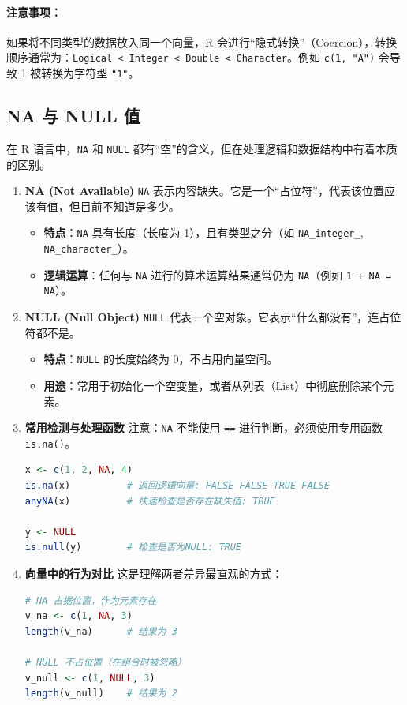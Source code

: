 \paragraph{注意事项：}
如果将不同类型的数据放入同一个向量，R 会进行“隐式转换”（Coercion），转换顺序通常为：\texttt{Logical < Integer < Double < Character}。例如 \texttt{c(1, "A")} 会导致 1 被转换为字符型 \texttt{"1"}。

\subsection{NA 与 NULL 值}

在 R 语言中，\texttt{NA} 和 \texttt{NULL} 都有“空”的含义，但在处理逻辑和数据结构中有着本质的区别。

\begin{enumerate}[label=\arabic*., leftmargin=2em]
    \item \textbf{NA (Not Available)}
    \texttt{NA} 表示内容缺失。它是一个“占位符”，代表该位置应该有值，但目前不知道是多少。
    \begin{itemize}
        \item \textbf{特点}：\texttt{NA} 具有长度（长度为 1），且有类型之分（如 \texttt{NA\_integer\_}, \texttt{NA\_character\_}）。
        \item \textbf{逻辑运算}：任何与 \texttt{NA} 进行的算术运算结果通常仍为 \texttt{NA}（例如 \texttt{1 + NA = NA}）。
    \end{itemize}

    \item \textbf{NULL (Null Object)}
    \texttt{NULL} 代表一个空对象。它表示“什么都没有”，连占位符都不是。
    \begin{itemize}
        \item \textbf{特点}：\texttt{NULL} 的长度始终为 0，不占用向量空间。
        \item \textbf{用途}：常用于初始化一个空变量，或者从列表（List）中彻底删除某个元素。
    \end{itemize}

    \item \textbf{常用检测与处理函数}
    注意：\texttt{NA} 不能使用 \texttt{==} 进行判断，必须使用专用函数 \texttt{is.na()}。
\begin{lstlisting}[language=R]
x <- c(1, 2, NA, 4)
is.na(x)          # 返回逻辑向量: FALSE FALSE TRUE FALSE
anyNA(x)          # 快速检查是否存在缺失值: TRUE

y <- NULL
is.null(y)        # 检查是否为NULL: TRUE
\end{lstlisting}

    \item \textbf{向量中的行为对比}
    这是理解两者差异最直观的方式：
\begin{lstlisting}[language=R]
# NA 占据位置，作为元素存在
v_na <- c(1, NA, 3)
length(v_na)      # 结果为 3

# NULL 不占位置（在组合时被忽略）
v_null <- c(1, NULL, 3)
length(v_null)    # 结果为 2
\end{lstlisting}
\end{enumerate}




